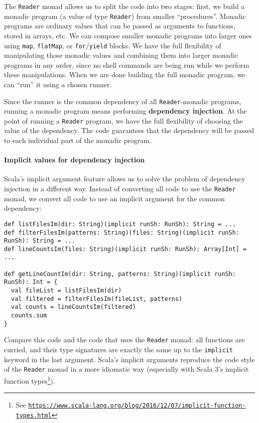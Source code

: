 The \lstinline!Reader! monad allows us to split the code into two
stages: first, we build a monadic program (a value of type \lstinline!Reader!)
from smaller \textsf{``}procedures\textsf{''}. Monadic programs are ordinary values
that can be passed as arguments to functions, stored in arrays, etc.
We can compose smaller monadic programs into larger ones using \lstinline!map!,
\lstinline!flatMap!, or \lstinline!for!/\lstinline!yield! blocks.
We have the full flexibility of manipulating those monadic values
and combining them into larger monadic programs in any order, since
no shell commands are being run while we perform these manipulations.
When we are done building the full monadic program, we can \textsf{``}run\textsf{''}
it using a chosen runner.

Since the runner is the common dependency of all \lstinline!Reader!-monadic
programs, running a monadic program means performing \textbf{dependency
injection}. At the point of running a
\lstinline!Reader! program, we have the full flexibility of choosing
the value of the dependency. The code guarantees that the dependency
will be passed to each individual part of the monadic program.

\paragraph{Implicit values for dependency injection}

Scala\textsf{'}s implicit argument feature allows us to solve the problem of
dependency injection in a different way. Instead of converting all
code to use the \lstinline!Reader! monad, we convert all code to
use an implicit argument for the common dependency:
\begin{lstlisting}
def listFilesIm(dir: String)(implicit runSh: RunSh): String = ...
def filterFilesIm(patterns: String)(files: String)(implicit runSh: RunSh): String = ...
def lineCountsIm(files: String)(implicit runSh: RunSh): Array[Int] = ...

def getLineCountIm(dir: String, patterns: String)(implicit runSh: RunSh): Int = {
  val fileList = listFilesIm(dir)
  val filtered = filterFilesIm(fileList, patterns)
  val counts = lineCountsIm(filtered)
  counts.sum
}
\end{lstlisting}
Compare this code and the code that uses the \lstinline!Reader! monad:
all functions are curried, and their type signatures are exactly the
same up to the \lstinline!implicit! keyword in the last argument.
Scala\textsf{'}s implicit arguments reproduce the code style of the \lstinline!Reader!
monad in a more idiomatic way (especially with Scala 3\textsf{'}s implicit
function types\footnote{See \texttt{\href{https://www.scala-lang.org/blog/2016/12/07/implicit-function-types.html}{https://www.scala-lang.org/blog/2016/12/07/implicit-function-types.html}}}). 

